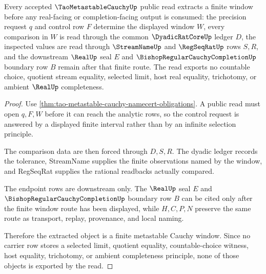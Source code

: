 \begin{theorem}\label{thm:tao-metastable-cauchy-window-extraction}
Every accepted $\TaoMetastableCauchyUp$ public read extracts a finite window before any real-facing or completion-facing output is consumed: the precision request $q$ and control row $F$ determine the displayed window $W$, every comparison in $W$ is read through the common $\DyadicRatCoreUp$ ledger $D$, the inspected values are read through $\StreamNameUp$ and $\RegSeqRatUp$ rows $S,R$, and the downstream $\RealUp$ seal $E$ and $\BishopRegularCauchyCompletionUp$ boundary row $B$ remain after that finite route. The read exports no countable choice, quotient stream equality, selected limit, host real equality, trichotomy, or ambient $\RealUp$ completeness.
\end{theorem}
\begin{proof}
Use \autoref{thm:tao-metastable-cauchy-namecert-obligations}. A public read must open $q,F,W$ before it can reach the analytic rows, so the control request is answered by a displayed finite interval rather than by an infinite selection principle.

The comparison data are then forced through $D,S,R$. The dyadic ledger records the tolerance, StreamName supplies the finite observations named by the window, and RegSeqRat supplies the rational readbacks actually compared.

The endpoint rows are downstream only. The $\RealUp$ seal $E$ and $\BishopRegularCauchyCompletionUp$ boundary row $B$ can be cited only after the finite window route has been displayed, while $H,C,P,N$ preserve the same route as transport, replay, provenance, and local naming.

Therefore the extracted object is a finite metastable Cauchy window. Since no carrier row stores a selected limit, quotient equality, countable-choice witness, host equality, trichotomy, or ambient completeness principle, none of those objects is exported by the read.
\end{proof}


